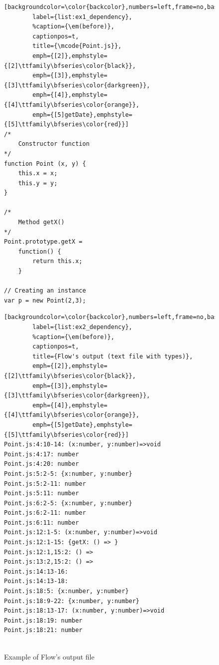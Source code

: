 \documentclass[review]{elsarticle}
\newcommand{\mcode}[1]{$\tt #1$}
\begin{document}
\begin{figure}[ht]
	\centering
	\begin{minipage}{.32\textwidth}
		\begin{lstlisting}[backgroundcolor=\color{backcolor},numbers=left,frame=no,basicstyle=\ttfamily\scriptsize,xleftmargin=5pt,
		label={list:ex1_dependency},
		%caption={\em(before)},
		captionpos=t,
		title={\mcode{Point.js}},
		emph={[2]},emphstyle={[2]\ttfamily\bfseries\color{black}},
		emph={[3]},emphstyle={[3]\ttfamily\bfseries\color{darkgreen}},
		emph={[4]},emphstyle={[4]\ttfamily\bfseries\color{orange}},
		emph={[5]getDate},emphstyle={[5]\ttfamily\bfseries\color{red}}]
/*
	Constructor function
*/
function Point (x, y) {
	this.x = x;
	this.y = y;
}	
		
/*
	Method getX()
*/ 
Point.prototype.getX = 
	function() {
		return this.x;
	}
		
// Creating an instance 
var p = new Point(2,3);
		\end{lstlisting}
	\end{minipage}
	\begin{minipage}{.02\textwidth}
		\raggedleft{$\Rightarrow$}
	\end{minipage}
	\hspace{3pt}
	\begin{minipage}{.60\textwidth}
		\begin{lstlisting}[backgroundcolor=\color{backcolor},numbers=left,frame=no,basicstyle=\ttfamily\scriptsize,xleftmargin=5pt,
		label={list:ex2_dependency},
		%caption={\em(before)},
		captionpos=t,
		title={Flow's output (text file with types)},
		emph={[2]},emphstyle={[2]\ttfamily\bfseries\color{black}},
		emph={[3]},emphstyle={[3]\ttfamily\bfseries\color{darkgreen}},
		emph={[4]},emphstyle={[4]\ttfamily\bfseries\color{orange}},
		emph={[5]getDate},emphstyle={[5]\ttfamily\bfseries\color{red}}]
Point.js:4:10-14: (x:number, y:number)=>void
Point.js:4:17: number
Point.js:4:20: number
Point.js:5:2-5: {x:number, y:number}
Point.js:5:2-11: number
Point.js:5:11: number
Point.js:6:2-5: {x:number, y:number}
Point.js:6:2-11: number
Point.js:6:11: number
Point.js:12:1-5: (x:number, y:number)=>void
Point.js:12:1-15: {getX: () => }
Point.js:12:1,15:2: () => 
Point.js:13:2,15:2: () => 
Point.js:14:13-16: 
Point.js:14:13-18: 
Point.js:18:5: {x:number, y:number}
Point.js:18:9-22: {x:number, y:number}
Point.js:18:13-17: (x:number, y:number)=>void
Point.js:18:19: number
Point.js:18:21: number
		
		\end{lstlisting}
	\end{minipage}
	
	\centering\caption{Example of Flow's output file}
	\label{fig:example-flow-point}
\end{figure}
\end{document}
